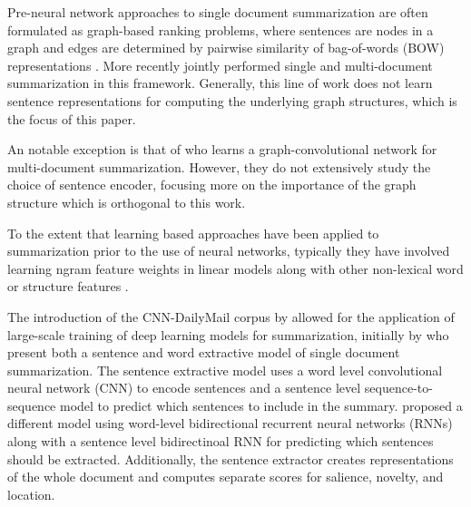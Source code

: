 

Pre-neural network
approaches to single document summarization
are often formulated as graph-based ranking problems, where
sentences are nodes in a graph and edges are determined by pairwise 
similarity of bag-of-words (BOW) representations 
\cite{erkan2004lexrank,mihalcea2005language}. 
More recently \citet{wan2010towards}
jointly performed single and multi-document summarization in this framework. 
Generally, this line of work does not learn sentence representations for 
computing the underlying graph structures, which is the focus of this paper.

An notable exception is that of
\cite{yasunaga2017graph}
who
learns a graph-convolutional network for
multi-document summarization. However, they do not extensively study the 
choice of sentence encoder, focusing more on the importance of the 
graph structure which is orthogonal to this work.

To the extent that learning based approaches have been applied
to summarization prior to the use of neural networks, typically they have involved learning ngram feature weights 
in linear models along with other non-lexical word or 
structure features 
\cite{berg2011jointly,sipos2012large,durrett2016learning}.

The introduction of the CNN-DailyMail corpus by \cite{nips15_hermann}
allowed for the application of large-scale training of deep learning models for summarization,
initially by \citep{cheng2016neural} who present both a sentence and word
extractive model of single document summarization. The sentence extractive
model uses a word level convolutional neural network (CNN) to encode 
sentences and a sentence level sequence-to-sequence model to predict 
which sentences to include in the summary. \citet{nallapati2017summarunner}
proposed a different model using word-level bidirectional recurrent neural 
networks (RNNs) along with a sentence level bidirectinoal RNN for 
predicting which sentences should be extracted. 
Additionally, the sentence
extractor creates representations of the whole document and computes 
separate scores for salience, novelty, and location.

